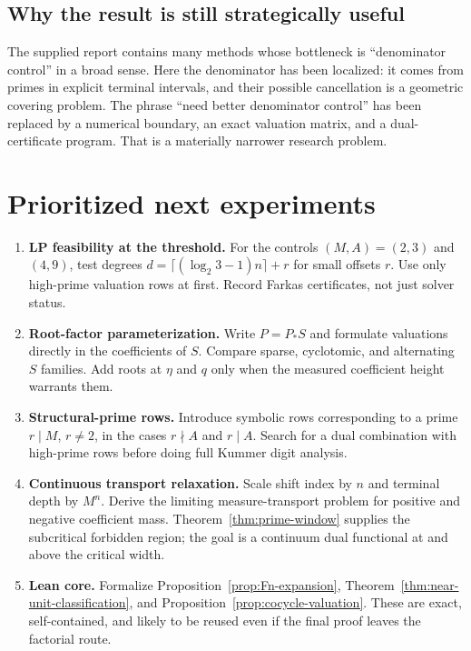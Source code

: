 \documentclass[11pt,oneside]{article}
\theoremstyle{definition}
\theoremstyle{remark}
\begin{document}
\subsection{Why the result is still strategically useful}

The supplied report contains many methods whose bottleneck is ``denominator control'' in a
broad sense.  Here the denominator has been localized: it comes from primes in explicit
terminal intervals, and their possible cancellation is a geometric covering problem.  The
phrase ``need better denominator control'' has been replaced by a numerical boundary, an
exact valuation matrix, and a dual-certificate program.  That is a materially narrower
research problem.

\section{Prioritized next experiments}
\label{sec:next}

\begin{enumerate}
\item \textbf{LP feasibility at the threshold.}
For the controls $(M,A)=(2,3)$ and $(4,9)$, test degrees
$d=\lceil(\log_2 3-1)n\rceil+r$ for small offsets $r$.  Use only high-prime valuation rows at
first.  Record Farkas certificates, not just solver status.

\item \textbf{Root-factor parameterization.}
Write $P=P_*S$ and formulate valuations directly in the coefficients of $S$.  Compare sparse,
cyclotomic, and alternating $S$ families.  Add roots at $\eta$ and $q$ only when the measured
coefficient height warrants them.

\item \textbf{Structural-prime rows.}
Introduce symbolic rows corresponding to a prime $r\mid M$, $r\ne2$, in the cases
$r\nmid A$ and $r\mid A$.  Search for a dual combination with high-prime rows before doing
full Kummer digit analysis.

\item \textbf{Continuous transport relaxation.}
Scale shift index by $n$ and terminal depth by $M^n$.  Derive the limiting measure-transport
problem for positive and negative coefficient mass.  Theorem~\ref{thm:prime-window} supplies
the subcritical forbidden region; the goal is a continuum dual functional at and above the
critical width.

\item \textbf{Lean core.}
Formalize Proposition~\ref{prop:Fn-expansion}, Theorem~\ref{thm:near-unit-classification},
and Proposition~\ref{prop:cocycle-valuation}.  These are exact, self-contained, and likely to
be reused even if the final proof leaves the factorial route.
\end{enumerate}
\end{document}
